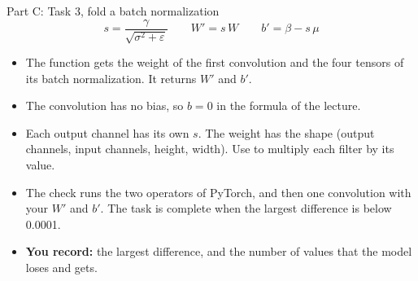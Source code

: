 \begin{frame}{Part C: Task 3, fold a batch normalization}
  \[
    s = \frac{\gamma}{\sqrt{\sigma^2 + \varepsilon}} \qquad
    W' = s\,W \qquad b' = \beta - s\,\mu
  \]
  \small
  \begin{itemize}
    \item The function  gets the weight of the first
          convolution and the four tensors of its batch normalization. It
          returns $W'$ and $b'$.
    \item The convolution has no bias, so $b = 0$ in the formula of the
          lecture.
    \item Each output channel has its own $s$. The weight has the shape
          (output channels, input channels, height, width). Use
           to multiply each filter by its
          value.
    \item The check runs the two operators of PyTorch, and then one
          convolution with your $W'$ and $b'$. The task is complete when
          the largest difference is below 0.0001.
    \item \textbf{You record:} the largest difference, and the number of
          values that the model loses and gets.
  \end{itemize}
\end{frame}

